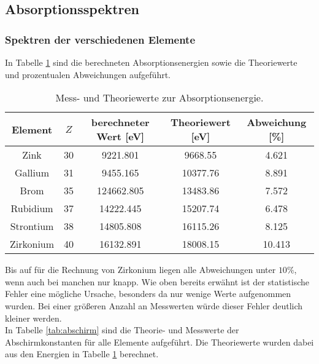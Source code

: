 \subsection{Absorptionsspektren}
    \subsubsection{Spektren der verschiedenen Elemente}
    In Tabelle \ref{tab:energies} sind die berechneten Absorptionsenergien sowie die Theoriewerte und prozentualen Abweichungen aufgeführt. 
    \begin{table}
        \centering
        \caption{Mess- und Theoriewerte zur Absorptionsenergie.}
        \label{tab:energies}
        \begin{tabular}{c c c c c}
            \toprule 
            Element & $Z$ & berechneter Wert [eV] & Theoriewert [eV] & Abweichung [\%] \\
            \midrule
            Zink & 30 & 9221.801 & 9668.55 & 4.621 \\
            Gallium & 31 & 9455.165 & 10377.76 & 8.891 \\
            Brom & 35 & 124662.805 & 13483.86 & 7.572 \\
            Rubidium & 37 & 14222.445 & 15207.74 & 6.478 \\
            Strontium & 38 & 14805.808 & 16115.26 & 8.125 \\
            Zirkonium & 40 & 16132.891 & 18008.15 & 10.413 \\
            \bottomrule
        \end{tabular}
    \end{table}
    \FloatBarrier

    \noindent Bis auf für die Rechnung von Zirkonium liegen alle Abweichungen unter $10\%$, wenn auch bei manchen nur knapp. Wie oben bereits erwähnt ist der statistische 
    Fehler eine mögliche Ursache, besonders da nur wenige Werte aufgenommen wurden. Bei einer größeren Anzahl an Messwerten würde dieser Fehler deutlich kleiner werden.\\
    In Tabelle \ref{tab:abschirm} sind die Theorie- und Messwerte der Abschirmkonstanten für alle Elemente aufgeführt. Die Theoriewerte wurden dabei aus den Energien 
    in Tabelle \ref{tab:energies} berechnet.

